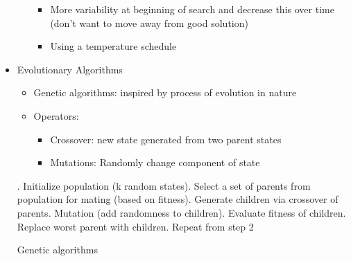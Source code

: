 \documentclass[../main.tex]{subfiles}
\begin{document}
\begin{itemize}
\begin{itemize}
\begin{itemize}
                \item More variability at beginning of search and decrease this over time (don't want to move away from good solution)
                \item Using a temperature schedule
            \end{itemize}
        \end{itemize}
        \item Evolutionary Algorithms
        \begin{itemize}
            \item Genetic algorithms: inspired by process of evolution in nature
            \item Operators:
            \begin{itemize}
                \item Crossover: new state generated from two parent states
                \item Mutations: Randomly change component of state
            \end{itemize}
        \end{itemize}
        \begin{algorithm}[H]
            . Initialize population (k random states). Select a set of parents from population for mating (based on fitness). Generate children via crossover of parents. Mutation (add randomness to children). Evaluate fitness of children. Replace worst parent with children. Repeat from step 2
            \caption{Genetic algorithms}
        \end{algorithm}
    \end{itemize}
\end{document}
